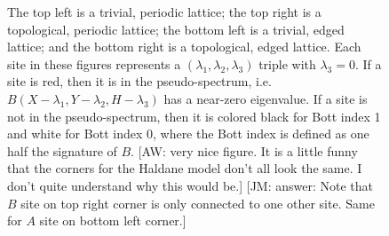 \documentclass[a4paper]{article}
\newcommand{\aw}[1]{{\color{blue} [AW: #1]}}
\newcommand{\jm}[1]{{\color{red} [JM: #1]}}
\begin{document}
\begin{figure}
\centering
{}%
%

%
%
\caption{The top left is a trivial, periodic lattice; the top right is a topological, periodic lattice; the bottom left is a trivial, edged lattice; and the bottom right is a topological, edged lattice.
Each site in these figures represents a $(\lambda_1,\lambda_2,\lambda_3)$ triple with $\lambda_3 = 0$.
If a site is red, then it is in the pseudo-spectrum, i.e. $B(X - \lambda_1, Y - \lambda_2, H - \lambda_3)$ has a near-zero eigenvalue.
If a site is not in the pseudo-spectrum, then it is colored black for Bott index 1 and white for Bott index 0, where the Bott index is defined as one half the signature of $B$. \aw{very nice figure. It is a little funny that the corners for the Haldane model don't all look the same. I don't quite understand why this would be.} \jm{answer: Note that $B$ site on top right corner is only connected to one other site. Same for $A$ site on bottom left corner.}
}%
\label{fig:Bott Haldane}%
\end{figure}
\end{document}
